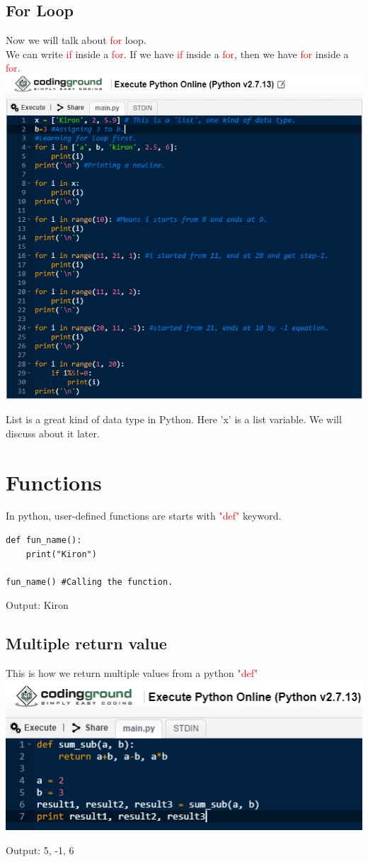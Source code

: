 \documentclass[11 pt, letterpaper]{report}
\begin{document}
\subsection{For Loop}
Now we will talk about \textcolor{red}{for} loop.\\
We can write \textcolor{red}{if} inside a \textcolor{red}{for}. If we have \textcolor{red}{if} inside a \textcolor{red}{for}, then we have \textcolor{red}{for} inside a \textcolor{red}{for}.\\
\includegraphics[width=260 px, height=230 px]{For Loop practice.png}

List is a great kind of data type in Python. Here 'x' is a list variable. We will discuss about it later.

\section{Functions}
In python, user-defined functions are starts with \textcolor{red}{"def"} keyword.
\begin{lstlisting}
def fun_name():
	print("Kiron")
	
fun_name() #Calling the function.
\end{lstlisting}
\begin{tcolorbox}
Output: Kiron
\end{tcolorbox}

\subsection{Multiple return value}
This is how we return multiple values from a python \textcolor{red}{"def"}\\
\centering
\includegraphics[width=200 px]{Multiple return value from function def.png}
\begin{tcolorbox}
Output: 5, -1, 6
\end{tcolorbox}
\end{document}
